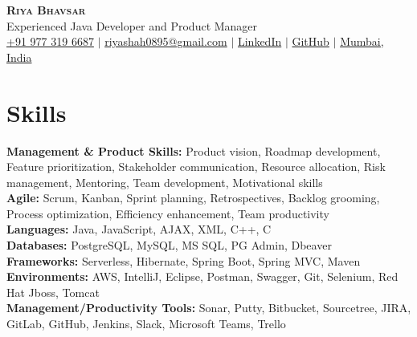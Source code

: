 \documentclass[letterpaper,11pt]{article}
\newcommand{\resumeSubHeadingListStart}{\begin{itemize}[leftmargin=0.15in, label={}]}
\newcommand{\resumeSubHeadingListEnd}{\end{itemize}}
\begin{document}

\begin{center}
  \textbf{\Huge \scshape Riya Bhavsar} \\ \vspace{3pt}
  \normalsize Experienced Java Developer and Product Manager \\ \vspace{3pt}
  \small
  \faMobile \hspace{.5pt} \href{tel:9773196687}{+91 977 319 6687}
  $|$
  \faAt \hspace{.5pt} \href{mailto:riyashah0895@gmail.com}{riyashah0895@gmail.com}
  $|$
  \faLinkedinSquare \hspace{.5pt} \href{https://www.linkedin.com/in/riya-j-bhavsar/}{LinkedIn}
  $|$
  \faGithub \hspace{.5pt} \href{https://github.com/riya-bhavsar}{GitHub}
  $|$
  \faMapMarker \hspace{.5pt} \href{https://goo.gl/maps/Czh1vXePukiKumpu5}{Mumbai, India}
\end{center}



\section{Skills}
\vspace{2pt}
\resumeSubHeadingListStart
\small{\item{
  \textbf{Management \& Product Skills:}{ Product vision, Roadmap development, Feature prioritization, Stakeholder communication, Resource allocation, Risk management, Mentoring, Team development, Motivational skills} \\ \vspace{3pt}
  \textbf{Agile:}{ Scrum, Kanban, Sprint planning, Retrospectives, Backlog grooming, Process optimization, Efficiency enhancement, Team productivity} \\ \vspace{3pt}
  \textbf{Languages:}{ Java, JavaScript, AJAX, XML, C++, C } \\ \vspace{3pt}
  \textbf{Databases:}{ PostgreSQL, MySQL, MS SQL, PG Admin, Dbeaver } \\ \vspace{3pt}
  \textbf{Frameworks:}{ Serverless, Hibernate, Spring Boot, Spring MVC, Maven } \\ \vspace{3pt}
  \textbf{Environments:}{ AWS, IntelliJ, Eclipse, Postman, Swagger, Git, Selenium, Red Hat Jboss, Tomcat } \\ \vspace{3pt}
  \textbf{Management/Productivity Tools:}{ Sonar, Putty, Bitbucket, Sourcetree, JIRA, GitLab, GitHub, Jenkins, Slack, Microsoft Teams, Trello } \\ \vspace{3pt}
}}
\resumeSubHeadingListEnd
\end{document}
